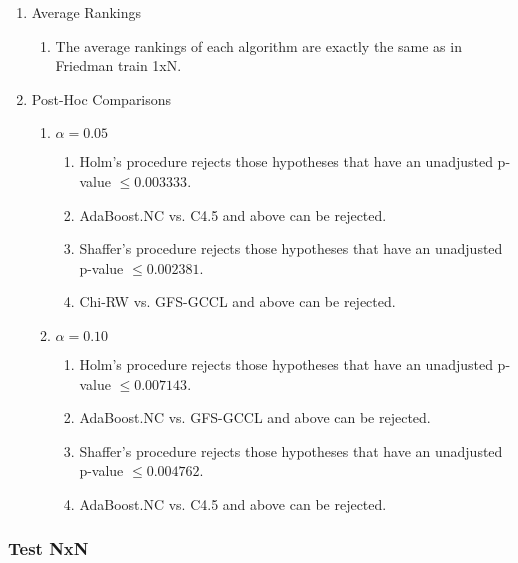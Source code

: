 \documentclass[a4paper,11pt]{article}
\begin{document}
\begin{enumerate}
\item Average Rankings
\begin{enumerate}
\item The average rankings of each algorithm are exactly the same as in Friedman train 1xN.
\end{enumerate}
\item Post-Hoc Comparisons
\begin{enumerate}
\item $\alpha = 0.05$
\begin{enumerate}
\item Holm's procedure rejects those hypotheses that have an unadjusted p-value $\le0.003333$.
\item AdaBoost.NC vs. C4.5 and above can be rejected.
\item Shaffer's procedure rejects those hypotheses that have an unadjusted p-value $\le0.002381$.
\item Chi-RW vs. GFS-GCCL and above can be rejected.
\end{enumerate}
\item $\alpha = 0.10$
\begin{enumerate}
\item Holm's procedure rejects those hypotheses that have an unadjusted p-value $\le0.007143$.
\item AdaBoost.NC vs. GFS-GCCL and above can be rejected.
\item Shaffer's procedure rejects those hypotheses that have an unadjusted p-value $\le0.004762$.
\item AdaBoost.NC vs. C4.5 and above can be rejected.
\end{enumerate}
\end{enumerate}
\end{enumerate}

\subsubsection{Test NxN}
\end{document}

